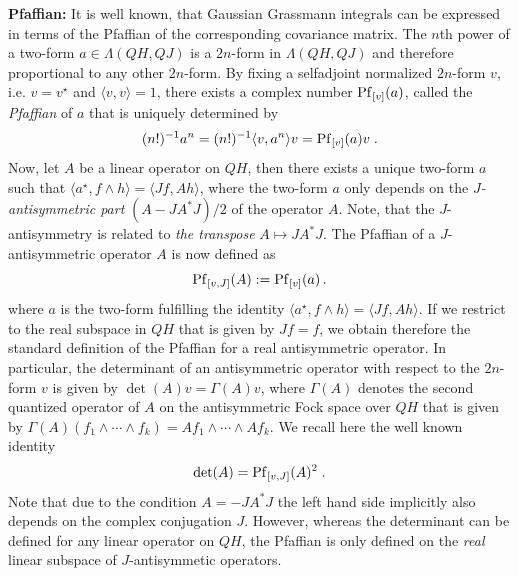 \documentclass[pra,twoside,amsmath,amsfonts,amssymb,superscriptaddress,showpacs]{revtex4}
\def\8#1{{\rm #1}}
\newcommand{\SPROD}[2]{\langle{#1},{#2}\rangle}
\newcommand{\GR}[2]{\Lambda(#1,#2)}
\newcommand{\ADJ}{\star}
\begin{document}
\noindent
{\bf Pfaffian:}
It is well known, that Gaussian Grassmann integrals can be expressed in terms of the Pfaffian of
the corresponding covariance matrix. The $n$th power of a two-form $a\in\GR{QH}{QJ}$ is a $2n$-form
in
$\GR{QH}{QJ}$ and therefore proportional to any other $2n$-form. By fixing a selfadjoint normalized
$2n$-form $v$, i.e. $v=v^\ADJ$ and $\SPROD{v}{v}=1$, there
exists a complex number $\8{Pf}_{[v]}(a)$, called the {\em Pfaffian} of $a$ that is
uniquely determined by 
\begin{equation}
(n!)^{-1}a^n=(n!)^{-1}\SPROD{v}{a^n} v =\8{Pf}_{[v]}(a)v \; .
\end{equation}
Now, let $A$ be a linear operator on $QH$, then there exists
a unique two-form $a$ such that $\SPROD{a^\ADJ}{f\wedge h}=\SPROD{Jf}{Ah}$, where the two-form $a$
only depends on the {\em $J$-antisymmetric part} $(A-JA^*J)/2$ of the operator $A$. Note, that the
$J$-antisymmetry is related to {\em the transpose} $A\mapsto JA^*J$. The Pfaffian of
a $J$-antisymmetric operator $A$ is now defined as
\begin{equation}
\8{Pf}_{[v,J]}(A):=\8{Pf}_{[v]}(a) \, .
\end{equation}
where $a$ is the two-form fulfilling the identity $\SPROD{a^\ADJ}{f\wedge h}=\SPROD{Jf}{Ah}$. If
we restrict to the real subspace in $QH$ that is given by $Jf=f$, we obtain therefore the standard
definition of the Pfaffian for a real antisymmetric operator. In particular, the determinant of an
antisymmetric operator with respect to the $2n$-form $v$ is given by
$\det(A)v=\Gamma(A)v$, where $\Gamma(A)$ denotes the second quantized operator of $A$
on the antisymmetric Fock space over $QH$ that is given by $\Gamma(A)(f_1\wedge\cdots\wedge
f_k)=Af_1\wedge\cdots\wedge Af_k$. We recall here the well known identity 
\begin{equation}
\det(A)=\8{Pf}_{[v,J]}(A)^2 \; .
\end{equation}
Note that due to the condition $A=-JA^*J$ the left hand side implicitly also depends on the complex
conjugation $J$. However, whereas the determinant can be defined for any linear operator on $QH$,
the Pfaffian is only defined on the {\em real} linear subspace of $J$-antisymmetic operators.
\end{document}
